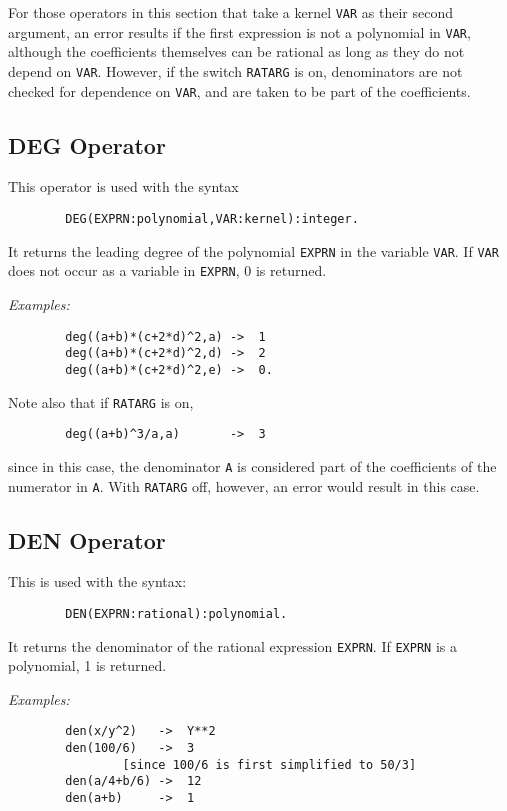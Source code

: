 For those operators in this section that take a kernel {\tt VAR} as their
second argument, an error results if the first expression is not a
polynomial in {\tt VAR}, although the coefficients themselves can be
rational as long as they do not depend on {\tt VAR}.  However, if the
switch {\tt RATARG} is on, denominators are not checked
for dependence on {\tt VAR}, and are taken to be part of the coefficients.

\subsection{DEG Operator}
\hypertarget{operator:DEG}{}

This operator is used with the syntax
\begin{verbatim}
        DEG(EXPRN:polynomial,VAR:kernel):integer.
\end{verbatim}
It returns the leading degree of the polynomial {\tt EXPRN}
in the variable {\tt VAR}.  If {\tt VAR} does not occur as a variable in
{\tt EXPRN}, 0 is returned.

{\it Examples:}
\begin{verbatim}
        deg((a+b)*(c+2*d)^2,a) ->  1
        deg((a+b)*(c+2*d)^2,d) ->  2
        deg((a+b)*(c+2*d)^2,e) ->  0.
\end{verbatim}
Note also that if {\tt RATARG} is on,
\begin{verbatim}
        deg((a+b)^3/a,a)       ->  3
\end{verbatim}
since in this case, the denominator {\tt A} is considered part of the
coefficients of the numerator in {\tt A}.  With {\tt RATARG} off, however,
an error would result in this case.

\subsection{DEN Operator}
\hypertarget{operator:DEN}{}

This is used with the syntax:
\begin{verbatim}
        DEN(EXPRN:rational):polynomial.
\end{verbatim}
It returns the denominator of the rational expression {\tt EXPRN}.  If
{\tt EXPRN} is a polynomial, 1 is returned.

{\it Examples:}
\begin{verbatim}
        den(x/y^2)   ->  Y**2
        den(100/6)   ->  3
                [since 100/6 is first simplified to 50/3]
        den(a/4+b/6) ->  12
        den(a+b)     ->  1
\end{verbatim}


